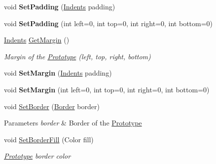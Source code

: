 \begin{DoxyCompactItemize}
void {\bfseries Set\+Padding} (\mbox{\hyperlink{struct_space_v_i_l_1_1_decorations_1_1_indents}{Indents}} padding)
\item 
\mbox{\label{class_space_v_i_l_1_1_prototype_ac841170beb27ea4e265d7a1b545a2401}} 
void {\bfseries Set\+Padding} (int left=0, int top=0, int right=0, int bottom=0)
\item 
\mbox{\hyperlink{struct_space_v_i_l_1_1_decorations_1_1_indents}{Indents}} \mbox{\hyperlink{class_space_v_i_l_1_1_prototype_aff828c5a3ba3253b301f93ecdb8e4876}{Get\+Margin}} ()
\begin{DoxyCompactList}\small\item\em Margin of the \mbox{\hyperlink{class_space_v_i_l_1_1_prototype}{Prototype}} (left, top, right, bottom) \end{DoxyCompactList}\item 
\mbox{\label{class_space_v_i_l_1_1_prototype_a3b6065f192db7ffb7874d96d5f58ec5a}} 
void {\bfseries Set\+Margin} (\mbox{\hyperlink{struct_space_v_i_l_1_1_decorations_1_1_indents}{Indents}} padding)
\item 
\mbox{\label{class_space_v_i_l_1_1_prototype_ac8ff5d679af7a825dc63831b2f043f9a}} 
void {\bfseries Set\+Margin} (int left=0, int top=0, int right=0, int bottom=0)
\item 
\mbox{\label{class_space_v_i_l_1_1_prototype_a0b5d107aa8d9b62508b37874b8bf4751}} 
void \mbox{\hyperlink{class_space_v_i_l_1_1_prototype_a0b5d107aa8d9b62508b37874b8bf4751}{Set\+Border}} (\mbox{\hyperlink{class_space_v_i_l_1_1_decorations_1_1_border}{Border}} border)
\begin{DoxyCompactList}\small\item\em 
\begin{DoxyParams}{Parameters}
{\em border} & Border of the \mbox{\hyperlink{class_space_v_i_l_1_1_prototype}{Prototype}} \\
\hline
\end{DoxyParams}
\end{DoxyCompactList}\item 
void \mbox{\hyperlink{class_space_v_i_l_1_1_prototype_a85d92e82dcd890f026c72bb04dfa2dd3}{Set\+Border\+Fill}} (Color fill)
\begin{DoxyCompactList}\small\item\em \mbox{\hyperlink{class_space_v_i_l_1_1_prototype}{Prototype}} border color \end{DoxyCompactList}\item 

\end{DoxyCompactItemize}
